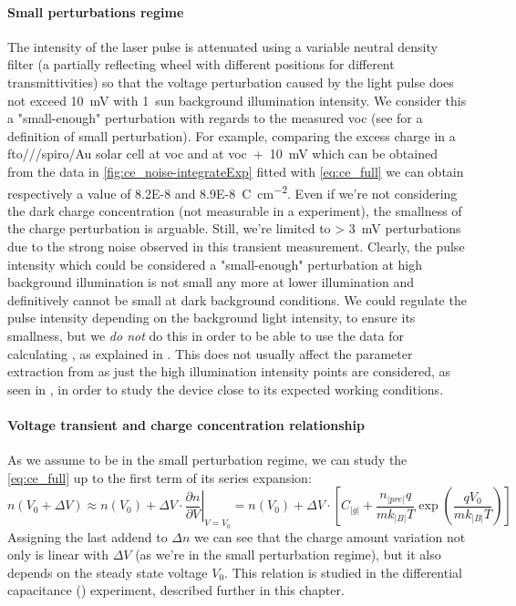\paragraph{Small perturbations regime}\label{tpv_perturbation}
The intensity of the laser pulse is attenuated using a variable neutral density filter (a partially reflecting wheel with different positions for different transmittivities) so that the voltage perturbation caused by the light pulse does not exceed \SI{10}{\mV} with 1~sun background illumination intensity.
We consider this a "small-enough" perturbation with regards to the measured \gls{voc} (see  for a definition of small perturbation).
For example, comparing the excess charge in a \gls{fto}\-/\-/\-/\gls{spiro}\-/Au solar cell at \gls{voc} and at \gls{voc}~+~\SI{10}{\mV} which can be obtained from the data in \cref{fig:ce_noise-integrateExp} fitted with \cref{eq:ce_full} we can obtain respectively a value of \SI{8.2E-8}{} and \SI{8.9E-8}{\coulomb\per\square\cm}.
Even if we're not considering the dark charge concentration (not measurable in a  experiment), the smallness of the charge perturbation is arguable.
Still, we're limited to \SI{> 3}{\mV} perturbations due to the strong noise observed in this transient measurement.
Clearly, the pulse intensity which could be considered a "small-enough" perturbation at high background illumination is not small any more at lower illumination and definitively cannot be small at dark background conditions.
We could regulate the pulse intensity depending on the background light intensity, to ensure its smallness, but we \emph{do not} do this in order to be able to use the  data for calculating , as explained in .
This does not usually affect the parameter extraction from  as just the high illumination intensity points are considered, as seen in , in order to study the device close to its expected working conditions.

	\paragraph{Voltage transient and charge concentration relationship}
	As we assume to be in the small perturbation regime, we can study the \cref{eq:ce_full} up to the first term of its series expansion:
	\begin{dmath*}
		n(V_0 + \Delta V) \approx n(V_0) + \Delta V \cdot \left.\frac{\partial n}{\partial V}\right\rvert_{V=V_0} = n(V_0) + \Delta V \cdot \left[C_|g| + \frac{n_|pre| q}{mk_|B|T}\exp(\frac{qV_0}{mk_|B|T})\right]
	\end{dmath*}
	Assigning the last addend to $\Delta n$ we can see that the charge amount variation not only is linear with $\Delta V$ (as we're in the small perturbation regime), but it also depends on the steady state voltage $V_0$.
	This relation is studied in the differential capacitance () experiment, described further in this chapter.

